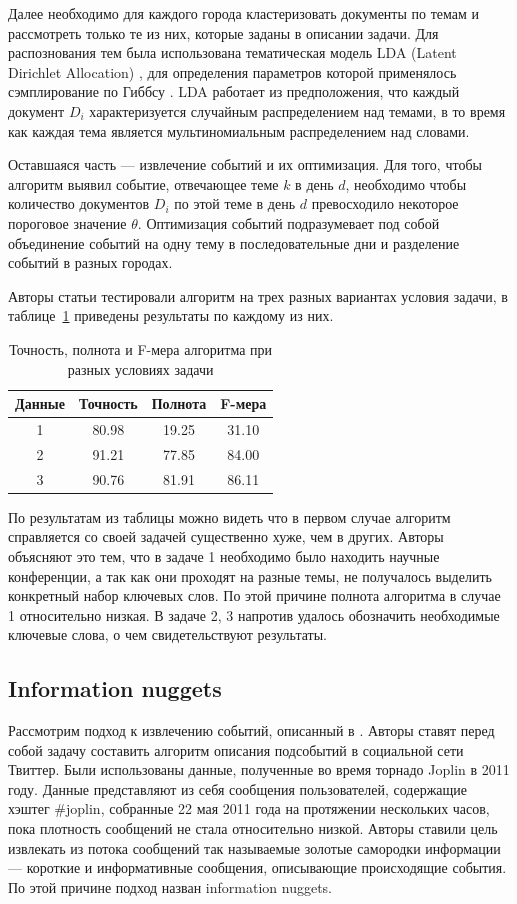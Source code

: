 \documentclass[12pt, a4paper]{article}
\begin{document}
	Далее необходимо для каждого города кластеризовать документы по темам и рассмотреть только те из них, которые заданы в описании задачи. Для распознования тем была использована тематическая модель LDA (Latent Dirichlet Allocation) \cite{lda-model}, для определения параметров которой применялось сэмплирование по Гиббсу \cite{lda-gibbs}. LDA работает из предположения, что каждый документ $D_i$ характеризуется случайным распределением над темами, в то время как каждая тема является мультиномиальным распределением над словами.
	
	Оставшаяся часть --- извлечение событий и их оптимизация. Для того, чтобы алгоритм выявил событие, отвечающее теме $k$ в день $d$, необходимо чтобы количество документов $D_i$ по этой теме в день $d$ превосходило некоторое пороговое значение $\theta$. Оптимизация событий подразумевает под собой объединение событий на одну тему в последовательные дни и разделение событий в разных городах.
	
	Авторы статьи тестировали алгоритм на трех разных вариантах условия задачи, в таблице~\ref{lda-table} приведены результаты по каждому из них.
	
\begin{table}[h]
	\centering
	\caption{Точность, полнота и F-мера алгоритма при разных условиях задачи}
    \begin{tabular}{c c c c}
    Данные & Точность & Полнота & F-мера \\ \hline
    1 & 80.98 & 19.25 & 31.10 \\ 
    2 & 91.21 & 77.85 & 84.00  \\ 
    3 & 90.76 & 81.91 & 86.11 \\ \hline
    \end{tabular}
    \label{lda-table}
\end{table}

	По результатам из таблицы можно видеть что в первом случае алгоритм справляется со своей задачей существенно хуже, чем в других. Авторы объясняют это тем, что в задаче 1 необходимо было находить научные конференции, а так как они проходят на разные темы, не получалось выделить конкретный набор ключевых слов. По этой причине полнота алгоритма в случае 1 относительно низкая. В задаче 2, 3 напротив удалось обозначить необходимые ключевые слова, о чем свидетельствуют результаты.
	
	\subsection{Information nuggets}
	Рассмотрим подход к извлечению событий, описанный в \cite{nuggets}. Авторы ставят перед собой задачу составить алгоритм описания подсобытий в социальной сети Твиттер. Были использованы данные, полученные во время торнадо Joplin в 2011 году. Данные представляют из себя сообщения пользователей, содержащие хэштег \#joplin, собранные 22 мая 2011 года на протяжении нескольких часов, пока плотность сообщений не стала относительно низкой. Авторы ставили цель извлекать из потока сообщений так называемые золотые самородки информации --- короткие и информативные сообщения, описывающие происходящие события. По этой причине подход назван information nuggets.
	
\end{document}
